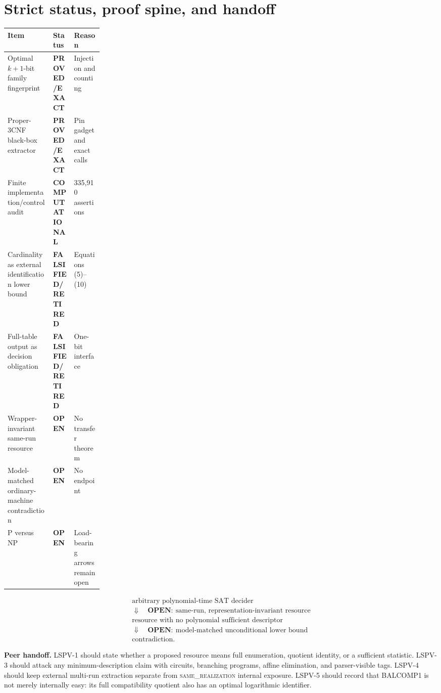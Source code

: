 \documentclass[11pt]{article}
\newcommand{\EXACT}{\textbf{PROVED/EXACT}}
\newcommand{\COMP}{\textbf{COMPUTATIONAL}}
\newcommand{\OPEN}{\textbf{OPEN}}
\newcommand{\RET}{\textbf{FALSIFIED/RETIRED}}
\newcommand{\same}{\textsc{same\_realization}}
\begin{document}
\section{Strict status, proof spine, and handoff}
\begin{center}\small
\begin{tabularx}{0.98\linewidth}{Xp{0.22\linewidth}X}
\toprule Item & Status & Reason\\ \midrule
Optimal \(k+1\)-bit family fingerprint & \EXACT & Injection and counting\\
Proper-3CNF black-box extractor & \EXACT & Pin gadget and exact calls\\
Finite implementation/control audit & \COMP & 335,910 assertions\\
Cardinality as external identification lower bound & \RET & Equations (5)--(10)\\
Full-table output as decision obligation & \RET & One-bit interface\\
Wrapper-invariant same-run resource & \OPEN & No transfer theorem\\
Model-matched ordinary-machine contradiction & \OPEN & No endpoint\\
P versus NP & \OPEN & Load-bearing arrows remain open\\
\bottomrule
\end{tabularx}
\end{center}

\[
\begin{array}{c}
\text{arbitrary polynomial-time SAT decider}\\
\Downarrow\quad\OPEN:\ \text{same-run, representation-invariant resource}\\
\text{resource with no polynomial sufficient descriptor}\\
\Downarrow\quad\OPEN:\ \text{model-matched unconditional lower bound}\\
\text{contradiction.}
\end{array}
\]

\textbf{Peer handoff.} LSPV-1 should state whether a proposed resource means
full enumeration, quotient identity, or a sufficient statistic.  LSPV-3
should attack any minimum-description claim with circuits, branching
programs, affine elimination, and parser-visible tags.  LSPV-4 should keep
external multi-run extraction separate from \same{} internal exposure.
LSPV-5 should record that BALCOMP1 is not merely internally easy: its full
compatibility quotient also has an optimal logarithmic identifier.
\end{document}
